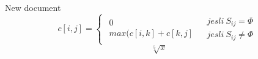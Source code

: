 \documentclass{article}
\begin{document}
New document
\begin{equation}  c[i,j]=\left\lbrace{\left.\begin{array}{ll}{\left.\begin{array}{ll}{0}\\{max(c[i,k]+c[k,j]}\end{array}\right.}&{\left.\begin{array}{ll}{jesli\ S_{ij}= \Phi }\\{jesli\ S_{ij} \neq  \Phi }\end{array}\right.}\end{array}\right.}\right.  \end{equation}
\begin{equation} \sqrt[5]{x} \end{equation}
\end{document}
